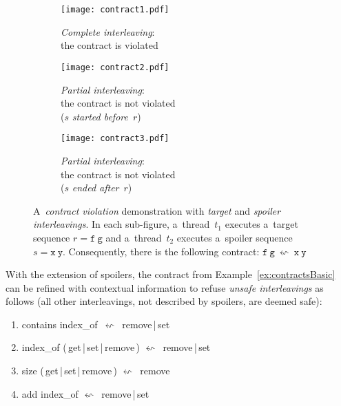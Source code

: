 \begin{figure}[hbt]
    \centering

    \begin{subfigure}[t]{.31 \linewidth}
        \centering
        \texttt{[image: contract1.pdf]}
        \caption{\emph{Complete interleaving}: \\ the contract is violated}
        \label{fig:contract1}
    \end{subfigure}
%
    \hfill
%
    \begin{subfigure}[t]{.31 \linewidth}
        \centering
        \texttt{[image: contract2.pdf]}
        \caption{\emph{Partial interleaving}: \\ the contract is not violated \\ ($ s $ \emph{started before}~$ r $)}
        \label{fig:contract2}
    \end{subfigure}
%
    \hfill
%
    \begin{subfigure}[t]{.31 \linewidth}
        \centering
        \texttt{[image: contract3.pdf]}
        \caption{\emph{Partial interleaving}: \\ the contract is not violated \\ ($ s $ \emph{ended after}~$ r $)}
        \label{fig:contract3}
    \end{subfigure}

    \caption{A~\emph{contract violation} demonstration with \emph{target} and \emph{spoiler interleavings}. In each sub-figure, a~thread~$ t_1 $ executes a~target sequence $ r = \mathtt{f\ g} $ and a~thread~$ t_2 $ executes a~spoiler sequence $ s = \mathtt{x\ y} $. Consequently, there is the following contract: $ \mathtt{f\ g}\ \leftsquigarrow\ \mathtt{x\ y} $~\cite{muzikovskaBP}}
\end{figure}

\begin{example}
    With the extension of spoilers, the contract from Example~\ref{ex:contractsBasic} can be refined with contextual information to refuse \emph{unsafe interleavings} as follows (all other interleavings, not described by spoilers, are deemed  safe):
    \begin{enumerate}[label={($ \varrho^{\prime\prime}_{\arabic*} $)}]
        \tt

        \item contains index\_of\ $ \leftsquigarrow $\ remove\,|\,set

        \item index\_of (\,get\,|\,set\,|\,remove\,) $ \leftsquigarrow $\ remove\,|\,set

        \item size (\,get\,|\,set\,|\,remove\,) $ \leftsquigarrow $\ remove

        \item add index\_of $ \leftsquigarrow $\ remove\,|\,set
    \end{enumerate}
\end{example}

